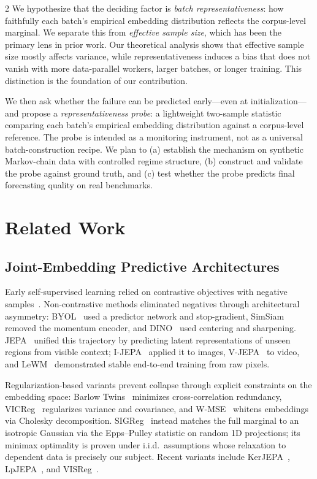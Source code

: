 \documentclass[10pt]{article}
\theoremstyle{remark}
\begin{document}
\begin{multicols*}{2}
We hypothesize that the deciding factor is \emph{batch representativeness}: how faithfully each batch's empirical embedding distribution reflects the corpus-level marginal. We separate this from \emph{effective sample size}, which has been the primary lens in prior work. Our theoretical analysis shows that effective sample size mostly affects variance, while representativeness induces a bias that does not vanish with more data-parallel workers, larger batches, or longer training. This distinction is the foundation of our contribution.

We then ask whether the failure can be predicted early---even at initialization---and propose a \emph{representativeness probe}: a lightweight two-sample statistic comparing each batch's empirical embedding distribution against a corpus-level reference. The probe is intended as a monitoring instrument, not as a universal batch-construction recipe. We plan to (a) establish the mechanism on synthetic Markov-chain data with controlled regime structure, (b) construct and validate the probe against ground truth, and (c) test whether the probe predicts final forecasting quality on real benchmarks.

\section{Related Work}

\subsection{Joint-Embedding Predictive Architectures}

Early self-supervised learning relied on contrastive objectives with negative samples~\cite{chen2020simclr,he2020moco}. Non-contrastive methods eliminated negatives through architectural asymmetry: BYOL~\cite{grill2020byol} used a predictor network and stop-gradient, SimSiam~\cite{chen2021simsiam} removed the momentum encoder, and DINO~\cite{caron2021dino} used centering and sharpening. JEPA~\cite{lecun2022jepa} unified this trajectory by predicting latent representations of unseen regions from visible context; I-JEPA~\cite{assran2023ijepa} applied it to images, V-JEPA~\cite{bardes2024vjepa} to video, and LeWM~\cite{maes2026lewm} demonstrated stable end-to-end training from raw pixels.

Regularization-based variants prevent collapse through explicit constraints on the embedding space: Barlow Twins~\cite{zbontar2021barlow} minimizes cross-correlation redundancy, VICReg~\cite{bardes2022vicreg} regularizes variance and covariance, and W-MSE~\cite{ermolov2021wmse} whitens embeddings via Cholesky decomposition. SIGReg~\cite{balestriero2025lejepa} instead matches the full marginal to an isotropic Gaussian via the Epps--Pulley statistic on random 1D projections; its minimax optimality is proven under i.i.d.\ assumptions whose relaxation to dependent data is precisely our subject. Recent variants include KerJEPA~\cite{zimmermann2025kerjepa}, LpJEPA~\cite{kuang2026lpjepa}, and VISReg~\cite{wu2026visreg}.


\end{multicols*}
\end{document}
